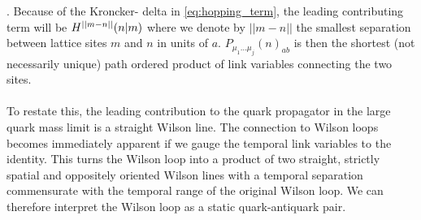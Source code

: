 \documentclass[a4paper,10pt]{book}
\begin{document}
\cite{Gattringer:2010zz}. Because of the Kroncker- delta in \eqref{eq:hopping_term}, the leading contributing term will be $H^{||m-n||}(n\mkern-5mu \mid\mkern-5mu m)$ where we denote by $||m-n||$ the smallest separation between lattice sites $m$ and $n$ in units of $a$. $P_{\mu_{1} \ldots \mu_{j}}(n)_{a b}$ is then the shortest (not necessarily unique) path ordered product of link variables connecting the two sites.\\\\To restate this, the leading contribution to the quark propagator in the large quark mass limit is a straight Wilson line. The connection to Wilson loops becomes immediately apparent if we gauge the temporal link variables to the identity. This turns the Wilson loop into a product of two straight, strictly spatial and oppositely oriented Wilson lines with a temporal separation commensurate with the temporal range of the original Wilson loop. We can therefore interpret the Wilson loop as a static quark-antiquark pair.
\end{document}
